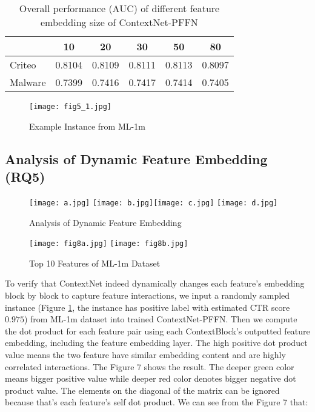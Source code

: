 \documentclass[sigconf]{acmart}
\begin{document}
\begin{table}[h]
\centering
\caption{Overall performance (AUC) of different feature embedding size of ContextNet-PFFN}
\begin{tabular}{l|ccccc}
\toprule
 & \textbf{10} & \textbf{20} & \textbf{30} & \textbf{50} & \textbf{80}  \\
\midrule
   Criteo & 0.8104 & 0.8109 & 0.8111 & 0.8113 & 0.8097 \\
   Malware & 0.7399 & 0.7416 & 0.7417 & 0.7414 & 0.7405 \\
\bottomrule
\end{tabular}\label{tab:differentembeddingsize}
\end{table}





\begin{figure}
  \setlength{\abovecaptionskip}{0pt}
  \centering
  \texttt{[image: fig5\_1.jpg]}
  \caption{Example Instance from ML-1m}
  \label{fig.fig5}
\end{figure}

\subsection{Analysis of Dynamic Feature Embedding (RQ5)}

\begin{figure}
  \setlength{\abovecaptionskip}{2pt}
  \centering
  \texttt{[image: a.jpg]}\hfill
  \texttt{[image: b.jpg]}\texttt{[image: c.jpg]}\hfill
  \texttt{[image: d.jpg]}
  \label{fig.featureemb}
  \caption{Analysis of Dynamic Feature Embedding}
\end{figure}

\begin{figure}
  \setlength{\abovecaptionskip}{2pt}
  \centering
  \texttt{[image: fig8a.jpg]}\hfill
  \texttt{[image: fig8b.jpg]}
  \label{fig.fig8}
  \caption{Top 10 Features of ML-1m Dataset}
\end{figure}

To verify that ContextNet indeed dynamically changes each feature’s embedding block by block to capture feature interactions, we input a randomly sampled instance (Figure \ref{fig.fig5}, the instance has positive label with estimated CTR score $0.975$)  from ML-1m dataset into trained ContextNet-PFFN. Then we compute the dot product for each feature pair using each ContextBlock’s outputted feature embedding, including the feature embedding layer. The high positive dot product value means the two feature have similar embedding content and are highly correlated interactions.  The Figure 7 shows the result. The deeper green color means bigger positive value while deeper red color denotes bigger negative dot product value. The elements on the diagonal of the matrix can be ignored because that's  each feature's  self dot product.  We can see from the Figure 7 that:
\end{document}
